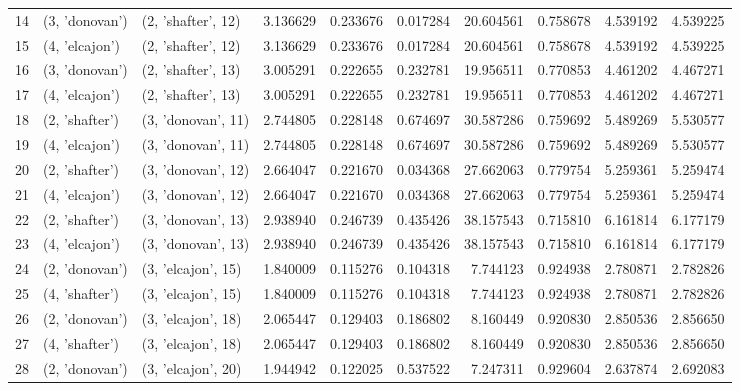 \begin{tabular}{lllrrrrrrr}
14 &   (3, 'donovan') &  (2, 'shafter', 12) &  3.136629 &   0.233676 &  0.017284 &  20.604561 &  0.758678 &   4.539192 &  4.539225 \\
15 &   (4, 'elcajon') &  (2, 'shafter', 12) &  3.136629 &   0.233676 &  0.017284 &  20.604561 &  0.758678 &   4.539192 &  4.539225 \\
16 &   (3, 'donovan') &  (2, 'shafter', 13) &  3.005291 &   0.222655 &  0.232781 &  19.956511 &  0.770853 &   4.461202 &  4.467271 \\
17 &   (4, 'elcajon') &  (2, 'shafter', 13) &  3.005291 &   0.222655 &  0.232781 &  19.956511 &  0.770853 &   4.461202 &  4.467271 \\
18 &   (2, 'shafter') &  (3, 'donovan', 11) &  2.744805 &   0.228148 &  0.674697 &  30.587286 &  0.759692 &   5.489269 &  5.530577 \\
19 &   (4, 'elcajon') &  (3, 'donovan', 11) &  2.744805 &   0.228148 &  0.674697 &  30.587286 &  0.759692 &   5.489269 &  5.530577 \\
20 &   (2, 'shafter') &  (3, 'donovan', 12) &  2.664047 &   0.221670 &  0.034368 &  27.662063 &  0.779754 &   5.259361 &  5.259474 \\
21 &   (4, 'elcajon') &  (3, 'donovan', 12) &  2.664047 &   0.221670 &  0.034368 &  27.662063 &  0.779754 &   5.259361 &  5.259474 \\
22 &   (2, 'shafter') &  (3, 'donovan', 13) &  2.938940 &   0.246739 &  0.435426 &  38.157543 &  0.715810 &   6.161814 &  6.177179 \\
23 &   (4, 'elcajon') &  (3, 'donovan', 13) &  2.938940 &   0.246739 &  0.435426 &  38.157543 &  0.715810 &   6.161814 &  6.177179 \\
24 &   (2, 'donovan') &  (3, 'elcajon', 15) &  1.840009 &   0.115276 &  0.104318 &   7.744123 &  0.924938 &   2.780871 &  2.782826 \\
25 &   (4, 'shafter') &  (3, 'elcajon', 15) &  1.840009 &   0.115276 &  0.104318 &   7.744123 &  0.924938 &   2.780871 &  2.782826 \\
26 &   (2, 'donovan') &  (3, 'elcajon', 18) &  2.065447 &   0.129403 &  0.186802 &   8.160449 &  0.920830 &   2.850536 &  2.856650 \\
27 &   (4, 'shafter') &  (3, 'elcajon', 18) &  2.065447 &   0.129403 &  0.186802 &   8.160449 &  0.920830 &   2.850536 &  2.856650 \\
28 &   (2, 'donovan') &  (3, 'elcajon', 20) &  1.944942 &   0.122025 &  0.537522 &   7.247311 &  0.929604 &   2.637874 &  2.692083 \\

\end{tabular}

